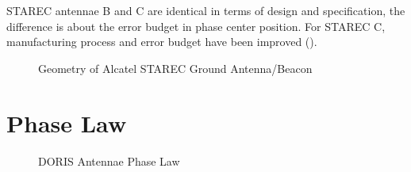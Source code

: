 STAREC antennae B and C are identical in terms of design and specification, the
difference is about the error budget in phase center position. For STAREC C,
manufacturing process and error budget have been improved (\cite{DORISGSM}).

\begin{figure}
\centering

\caption{Geometry of Alcatel STAREC Ground Antenna/Beacon}
\label{fig:starec-antenna}
\end{figure}

\section{Phase Law}

\begin{figure}
\centering

\caption{DORIS Antennae Phase Law}
\label{fig:doris-antennae-phase-law}
\end{figure}
